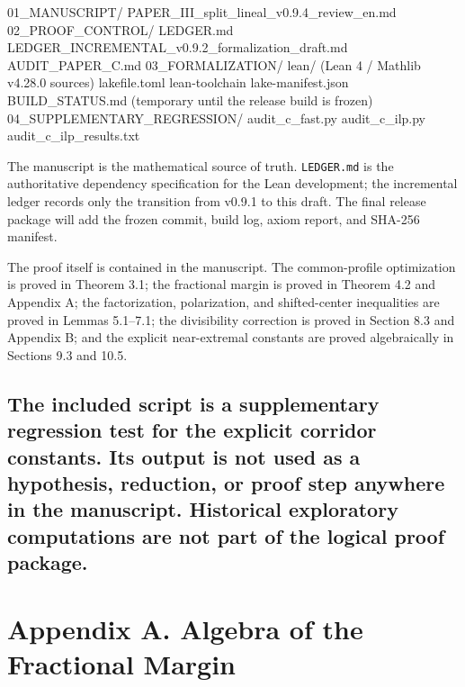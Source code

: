 \documentclass[
  11pt,
]{article}
\newenvironment{Shaded}{}{}
\newcommand{\NormalTok}[1]{#1}
\begin{document}
\begin{Shaded}
\begin{Highlighting}[]
\NormalTok{01\_MANUSCRIPT/}
\NormalTok{    PAPER\_III\_split\_lineal\_v0.9.4\_review\_en.md}
\NormalTok{02\_PROOF\_CONTROL/}
\NormalTok{    LEDGER.md}
\NormalTok{    LEDGER\_INCREMENTAL\_v0.9.2\_formalization\_draft.md}
\NormalTok{    AUDIT\_PAPER\_C.md}
\NormalTok{03\_FORMALIZATION/}
\NormalTok{    lean/                         (Lean 4 / Mathlib v4.28.0 sources)}
\NormalTok{    lakefile.toml}
\NormalTok{    lean{-}toolchain}
\NormalTok{    lake{-}manifest.json}
\NormalTok{    BUILD\_STATUS.md               (temporary until the release build is frozen)}
\NormalTok{04\_SUPPLEMENTARY\_REGRESSION/}
\NormalTok{    audit\_c\_fast.py}
\NormalTok{    audit\_c\_ilp.py}
\NormalTok{    audit\_c\_ilp\_results.txt}
\end{Highlighting}
\end{Shaded}

The manuscript is the mathematical source of truth. \texttt{LEDGER.md}
is the authoritative dependency specification for the Lean development;
the incremental ledger records only the transition from v0.9.1 to this
draft. The final release package will add the frozen commit, build log,
axiom report, and SHA-256 manifest.

The proof itself is contained in the manuscript. The common-profile
optimization is proved in Theorem 3.1; the fractional margin is proved
in Theorem 4.2 and Appendix A; the factorization, polarization, and
shifted-center inequalities are proved in Lemmas 5.1--7.1; the
divisibility correction is proved in Section 8.3 and Appendix B; and the
explicit near-extremal constants are proved algebraically in Sections
9.3 and 10.5.

\subsection{The included script is a supplementary regression test for
the explicit corridor constants. Its output is not used as a hypothesis,
reduction, or proof step anywhere in the manuscript. Historical
exploratory computations are not part of the logical proof
package.}\label{the-included-script-is-a-supplementary-regression-test-for-the-explicit-corridor-constants.-its-output-is-not-used-as-a-hypothesis-reduction-or-proof-step-anywhere-in-the-manuscript.-historical-exploratory-computations-are-not-part-of-the-logical-proof-package.}

\section{Appendix A. Algebra of the Fractional
Margin}\label{appendix-a.-algebra-of-the-fractional-margin}
\end{document}
